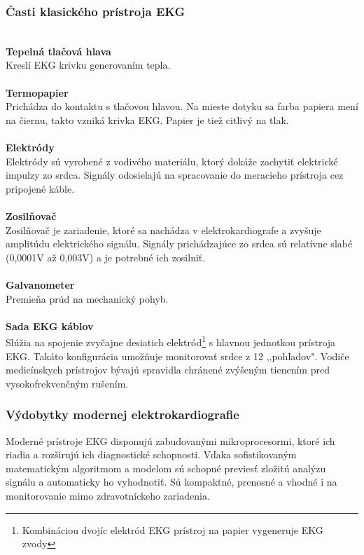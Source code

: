\documentclass[titlepage,12pt]{article}
\begin{document}
\subsubsection{Časti klasického prístroja EKG}
\textbf{\\Tepelná tlačová hlava}
\\
Kreslí EKG krivku generovaním tepla.
\\
\\
\textbf{Termopapier}
\\
Prichádza do kontaktu s tlačovou hlavou. Na mieste dotyku sa farba papiera mení na čiernu, takto vzniká krivka EKG. Papier je tiež citlivý na tlak.
\\
\\
\textbf{Elektródy}
\\
Elektródy sú vyrobené z vodivého materiálu, ktorý dokáže zachytiť elektrické impulzy zo srdca. Signály odosielajú na spracovanie do meracieho prístroja cez pripojené káble.
\\
\\
\textbf{Zosilňovač}
\\
Zosilňovač je zariadenie, ktoré sa nachádza v elektrokardiografe a zvyšuje amplitúdu elektrického signálu. Signály prichádzajúce zo srdca sú relatívne slabé (0,0001V až 0,003V) a je potrebné ich zosilniť.
\\
\\
\textbf{Galvanometer}
\\
Premieňa prúd na mechanický pohyb.
\\
\\
\textbf{Sada EKG káblov}
\\
Slúžia na spojenie zvyčajne desiatich elektród\footnote{Kombináciou dvojíc elektród EKG prístroj na papier vygeneruje EKG zvody} s hlavnou jednotkou prístroja EKG. Takáto konfigurácia umožňuje monitorovať srdce z 12 ,,pohľadov". Vodiče medicínskych prístrojov bývajú spravidla chránené zvýšeným tienením pred vysokofrekvenčným rušením.

\subsubsection{Výdobytky modernej elektrokardiografie}
Moderné prístroje EKG disponujú zabudovanými mikroprocesormi, ktoré ich riadia a rozširujú ich diagnostické schopnosti. Vďaka sofistikovaným matematickým algoritmom a modelom sú schopné previesť zložitú analýzu signálu a automaticky ho vyhodnotiť. Sú kompaktné, prenosné a vhodné i na monitorovanie mimo zdravotníckeho zariadenia.
\end{document}
